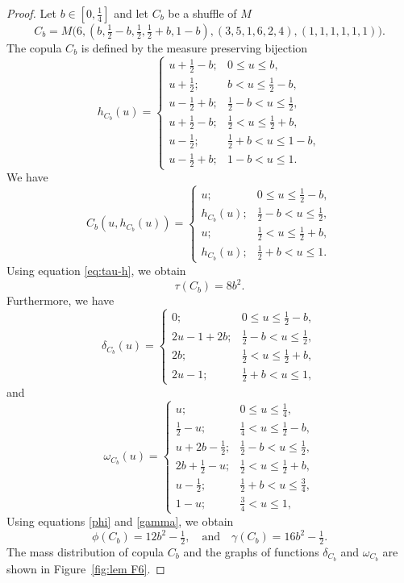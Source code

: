\documentclass[12pt,a4paper]{amsart}
\theoremstyle{definition}
\begin{document}
\begin{proof}
Let $b \in [0, \tfrac14]$  and let $C_b$ be a shuffle of $M$
$$C_b = M\big(6, (b, \tfrac12 - b, \tfrac12, \tfrac12 + b, 1-b), (3,5,1,6,2,4), (1, 1, 1, 1, 1, 1)\big).$$
The copula $C_b$ is defined by the measure preserving bijection 
$$ h_{C_b}(u) =  \begin{cases}
            u + \tfrac12 - b; &  0 \le u \le b, \\
            u + \tfrac12; &  b < u \le \tfrac12 - b, \\
            u - \tfrac12 + b; &  \tfrac12 - b < u \le \tfrac12, \\
            u + \tfrac12 - b; &  \tfrac12 < u \le \tfrac12 + b, \\
            u - \tfrac12; &  \tfrac12 + b < u \le 1-b, \\
            u - \tfrac12 + b; &  1-b < u \le 1.
            \end{cases}
$$
We have 
$$ C_b(u,h_{C_b}(u)) =  \begin{cases}
            u; &  0 \le u \le \tfrac12 - b, \\
            h_{C_b}(u); &  \tfrac12 - b < u \le \tfrac12, \\
            u; &  \tfrac12 < u \le \tfrac12 + b, \\
            h_{C_b}(u); &  \tfrac12 + b < u \le 1.
            \end{cases}
$$
Using equation \eqref{eq:tau-h}, we obtain
$$  \tau(C_b) = 8b^2. $$
Furthermore, we have
$$ \delta_{C_b}(u) =  \begin{cases}
            0; &  0 \le u \le \tfrac12-b, \\
            2u - 1 + 2b; &  \tfrac12-b < u \le \tfrac12, \\
            2b; &  \tfrac12 < u \le \tfrac12+b, \\
            2u-1; &  \tfrac12+b < u \le 1, 
            \end{cases}
$$
and
$$ \omega_{C_b}(u) =  \begin{cases}
            u; &  0 \le u \le \tfrac14, \\
            \tfrac12 - u; &  \tfrac14 < u \le \tfrac12 - b, \\     
            u + 2b - \tfrac12; &  \tfrac12-b < u \le \tfrac12, \\
            2b + \tfrac12 - u; &  \tfrac12 < u \le \tfrac12 + b, \\
            u - \tfrac12; &  \tfrac12 + b < u \le \tfrac34, \\
            1-u; &  \tfrac34 < u \le 1, 
            \end{cases}
$$
Using equations \eqref{phi}  and \eqref{gamma}, we obtain
$$  \phi(C_b) = 12b^2-\tfrac12, \quad \text{and} \quad \gamma(C_b) = 16b^2-\tfrac12. $$
The mass distribution of copula $C_b$ and the graphs of functions $\delta_{C_b}$ and $\omega_{C_b}$ are shown in Figure~\ref{fig:lem F6}.


\end{proof}
\end{document}
